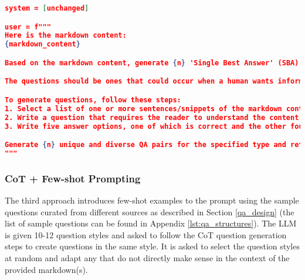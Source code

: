 \begin{lstlisting}[language=JSON,firstnumber=1,label={lst:cot_prompt},caption={CoT prompt for `local' multiple-choice question generation}]
system = [unchanged]

user = f"""
Here is the markdown content:
{markdown_content}

Based on the markdown content, generate {n} 'Single Best Answer' (SBA) questions that have only one correct answer out of five options. The correct answer should not be obvious and *should really require specific information from the source document to be able to be answered*. The incorrect answer options should not be so ridiculous or extreme that they are obviously wrong. The questions must be of the type: {qa_type_str}

The questions should be ones that could occur when a human wants information from the chatbot. They should be directly relevant to companies preparing their sustainability reports and reflect real-world scenarios that reporting teams might encounter.

To generate questions, follow these steps:
1. Select a list of one or more sentences/snippets of the markdown content that can be used to form an answer to a question. This will form the reference text. Remember this should be relevant to the human for drafting sustainability reports.
2. Write a question that requires the reader to understand the content of the selected text to answer correctly. The question should be based only on the selected text and should not require any additional information. Remember this should be the type of question a human would ask when drafting sustainability reports.
3. Write five answer options, one of which is correct and the other four are incorrect. The correct answer should be complete and taken verbatim from the selected section(s) of the markdown content.

Generate {n} unique and diverse QA pairs for the specified type and return them using the provided schema.
"""
\end{lstlisting}

\subsubsection{CoT + Few-shot Prompting}

The third approach introduces few-shot examples to the prompt using the sample questions curated from different sources as described in Section \ref{qa_design} (the list of sample questions can be found in Appendix \ref{lst:qa_structures}). The LLM is given 10-12 question styles and asked to follow the CoT question generation steps to create questions in the same style. It is asked to select the question styles at random and adapt any that do not directly make sense in the context of the provided markdown(s).

